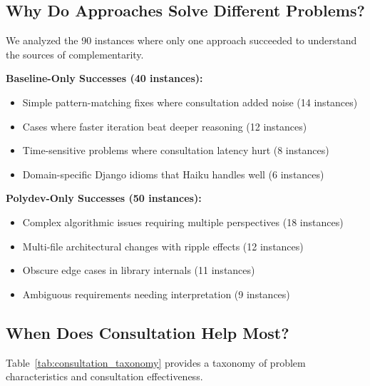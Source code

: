 \documentclass[11pt,a4paper]{article}
\begin{document}
\subsection{Why Do Approaches Solve Different Problems?}

We analyzed the 90 instances where only one approach succeeded to understand the sources of complementarity.

\textbf{Baseline-Only Successes (40 instances):}
\begin{itemize}
    \item Simple pattern-matching fixes where consultation added noise (14 instances)
    \item Cases where faster iteration beat deeper reasoning (12 instances)
    \item Time-sensitive problems where consultation latency hurt (8 instances)
    \item Domain-specific Django idioms that Haiku handles well (6 instances)
\end{itemize}

\textbf{Polydev-Only Successes (50 instances):}
\begin{itemize}
    \item Complex algorithmic issues requiring multiple perspectives (18 instances)
    \item Multi-file architectural changes with ripple effects (12 instances)
    \item Obscure edge cases in library internals (11 instances)
    \item Ambiguous requirements needing interpretation (9 instances)
\end{itemize}

\subsection{When Does Consultation Help Most?}

Table~\ref{tab:consultation_taxonomy} provides a taxonomy of problem characteristics and consultation effectiveness.
\end{document}
